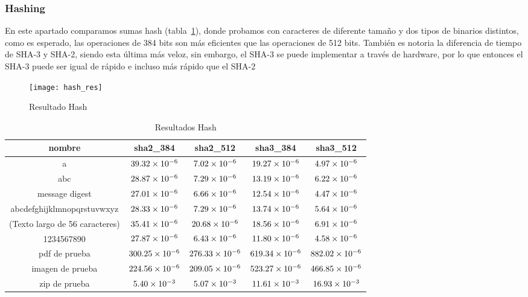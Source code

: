 \documentclass[../main.tex]{subfiles}
\begin{document}
\newpage{}

\subsubsection{Hashing}\label{sec:hash}

En este apartado comparamos sumas hash (tabla~\ref{tab:hash-res}), donde probamos con caracteres de diferente tamaño
y dos tipos de binarios distintos, como es esperado, las operaciones de 384 bits son más eficientes
que las operaciones de 512 bits. También es notoria la diferencia de tiempo de SHA-3 y SHA-2, siendo esta
última más veloz, sin embargo, el SHA-3 se puede implementar a través de hardware, por lo que
entonces el SHA-3 puede ser igual de rápido e incluso más rápido que el SHA-2

\begin{figure}[ht]
  \centering
  \texttt{[image: hash\_res]}
  \caption{Resultado Hash}\label{fig:hash}
\end{figure}

\begin{table}[ht]
  \centering
  \caption{Resultados Hash}\label{tab:hash-res}
  \begin{tabular}{|c|c|c|c|c|}
    \hline
    \rowcolor[HTML]{000000}
    {\color[HTML]{FFFFFF} nombre} & {\color[HTML]{FFFFFF} sha2\_384} & {\color[HTML]{FFFFFF} sha2\_512} & {\color[HTML]{FFFFFF} sha3\_384} & {\color[HTML]{FFFFFF} sha3\_512} \\ \hline
    a                          & $\num{39.32E-06}$  & $\num{7.02E-06 }$  & $\num{19.27E-06}$  & $\num{4.97E-06}$   \\ \hline
    \rowcolor[HTML]{C0C0C0}
    abc                        & $\num{28.87E-06}$  & $\num{7.29E-06 }$  & $\num{13.19E-06}$  & $\num{6.22E-06}$   \\ \hline
    message digest             & $\num{27.01E-06}$  & $\num{6.66E-06 }$  & $\num{12.54E-06}$  & $\num{4.47E-06}$   \\ \hline
    \rowcolor[HTML]{C0C0C0}
    abcdefghijklmnopqrstuvwxyz & $\num{28.33E-06}$  & $\num{7.29E-06 }$  & $\num{13.74E-06}$  & $\num{5.64E-06}$   \\ \hline
    (Texto largo de 56 caracteres)              & $\num{35.41E-06}$  & $\num{20.68E-06}$  & $\num{18.56E-06}$  & $\num{6.91E-06}$   \\ \hline
    \rowcolor[HTML]{C0C0C0}
    1234567890                 & $\num{27.87E-06}$  & $\num{6.43E-06 }$  & $\num{11.80E-06}$  & $\num{4.58E-06}$   \\ \hline
    pdf de prueba              & $\num{300.25E-06}$ & $\num{276.33E-06}$ & $\num{619.34E-06}$ & $\num{882.02E-06}$ \\ \hline
    \rowcolor[HTML]{C0C0C0}
    imagen de prueba           & $\num{224.56E-06}$ & $\num{209.05E-06}$ & $\num{523.27E-06}$ & $\num{466.85E-06}$ \\ \hline
    zip de prueba              & $\num{5.40E-03 }$  & $\num{5.07E-03 }$  & $\num{11.61E-03}$  & $\num{16.93E-03}$  \\ \hline
  \end{tabular}
\end{table}
\end{document}
